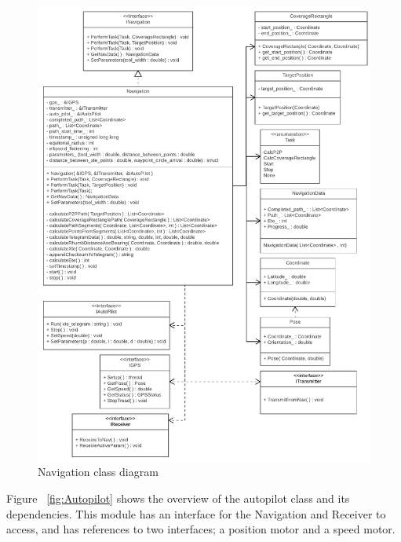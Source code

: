 \begin{figure}[H]
\centering
\includegraphics[max width=1\linewidth]{Navigation_class_diagram}
\caption{Navigation class diagram}
\label{fig:Navigation}
\end{figure}

Figure ~\ref{fig:Autopilot} shows the overview of the autopilot class and its dependencies. This module has an interface for the Navigation and Receiver to access, and has references to two interfaces; a position motor and a speed motor. 

